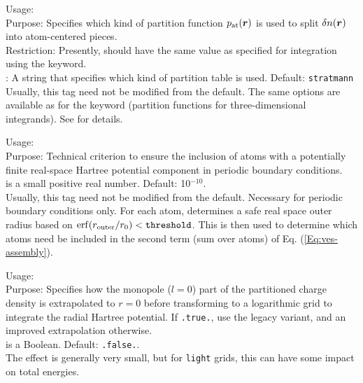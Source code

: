 {
  \noindent
  Usage:     \\[1.0ex]
  Purpose: Specifies which kind of partition function
    $p_\text{at}(\mbox{\boldmath$r$})$ is used to split $\delta n(\mbox{\boldmath$r$})$ into
    atom-centered pieces. \\[1.0ex] 
  Restriction: Presently,  should have the same
    value as specified for integration using the
   keyword. \\[1.0ex]
   : A string that specifies which kind of partition
    table is used. Default: \texttt{stratmann} \\ 
}
Usually, this tag need not be modified from the default. The same
options are available as for the  keyword
(partition functions for three-dimensional integrands). See
   for details. 

{
  \noindent
  Usage:   \\[1.0ex]
  Purpose: Technical criterion to ensure the inclusion of atoms with a
    potentially finite real-space Hartree potential component in periodic
    boundary conditions.  \\[1.0ex]
   is a small positive real number. Default:
  10$^{-10}$. \\
}
Usually, this tag need not be modified from the default. Necessary for
periodic boundary conditions only. For each atom, determines a safe
real space outer radius based on $\mathop{\mathrm{erf}}(r_\text{outer}/r_0) <
\mathtt{threshold}$. This is then used to determine which atoms need
be included in the second term (sum over atoms) of
Eq. (\ref{Eq:ves-assembly}). 

{
  \noindent
  Usage:   \\[1.0ex]
  Purpose: Specifies how the monopole ($l=0$) part of the partitioned charge
  density is extrapolated to $r=0$ before transforming to a logarithmic grid
  to integrate the radial Hartree potential.  If \texttt{.true.}, use the
  legacy variant, and an improved extrapolation otherwise.
  \\[1.0ex]
   is a Boolean.  Default: \texttt{.false.}.\\%
}%
The effect is generally very small, but for \texttt{light} grids, this can
have some impact on total energies.


